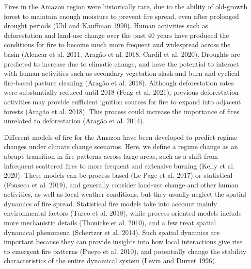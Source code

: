 \documentclass[
]{article}
\begin{document}
Fires in the Amazon region were historically rare, due to the ability of
old-growth forest to maintain enough moisture to prevent fire spread,
even after prolonged drought periods (Uhl and Kauffman 1990). Human
activities such as deforestation and land-use change over the past 40
years have produced the conditions for fire to become much more frequent
and widespread across the basin (Alencar et al. 2011, Aragão et al.
2018, Cardil et al. 2020). Droughts are predicted to increase due to
climatic change, and have the potential to interact with human
activities such as secondary vegetation slash-and-burn and cyclical
ﬁre-based pasture cleaning (Aragão et al. 2018). Although deforestation
rates were substantially reduced until 2018 (Feng et al. 2021), previous
deforestation activities may provide sufficient ignition sources for
fire to expand into adjacent forests (Aragão et al. 2018). This process
could increase the importance of fires unrelated to deforestation
(Aragão et al. 2014).

Different models of fire for the Amazon have been developed to predict
regime changes under climate change scenarios. Here, we define a regime
change as an abrupt transition in fire patterns across large areas, such
as a shift from infrequent scattered fires to more frequent and
extensive burning (Kelly et al. 2020). These models can be process-based
(Le Page et al. 2017) or statistical (Fonseca et al. 2019), and
generally consider land-use change and other human activities, as well
as local weather conditions, but they usually neglect the spatial
dynamics of fire spread. Statistical fire models take into account
mainly environmental factors (Turco et al. 2018), while process oriented
models include more mechanistic details (Thonicke et al. 2010), and a
few treat spatial dynamical phenomena (Schertzer et al. 2014). Such
spatial dynamics are important because they can provide insights into
how local interactions give rise to emergent fire patterns (Pueyo et al.
2010), and potentially change the stability characteristics of the
entire dynamical system (Levin and Durret 1996).
\end{document}
